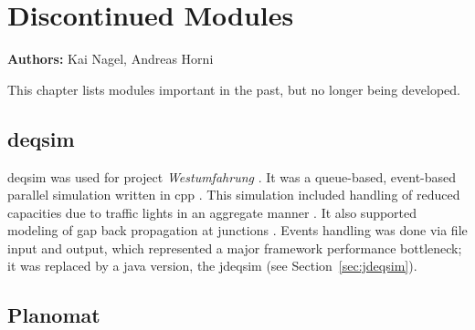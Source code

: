\chapter{Discontinued Modules}
\label{ch:discontinued}

\hfill \textbf{Authors:} Kai Nagel, Andreas Horni


This chapter lists modules important in the past, but no longer being developed.

\section{\protect\gls{deqsim}}
\label{sec:deqsim}
\gls{deqsim} was used for project \emph{Westumfahrung} \citep[][]{BalmerEtAl_ResRep_bdktzrh_2009}. It was a queue-based, event-based parallel simulation written in \gls{cpp} \citep[][]{CharyparEtAl_TRR_2007, Charypar_PhDThesis_2008}. This simulation included handling of reduced capacities due to traffic lights in an aggregate manner \citep[][p.139 ff]{Charypar_PhDThesis_2008}. It also supported modeling of gap back propagation at junctions \citep[][p.98 ff]{Charypar_PhDThesis_2008}. Events handling was done via file input and output, which represented a major framework performance bottleneck; it was replaced by a \gls{java} version, the \gls{jdeqsim} (see Section~\ref{sec:jdeqsim}).

\section{Planomat}
\label{sec:planomat}

